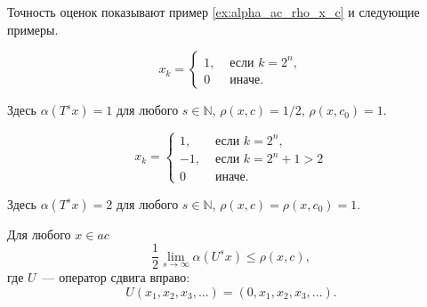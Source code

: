 Точность оценок показывают пример \ref{ex:alpha_ac_rho_x_c} и следующие примеры.
\begin{example}
	\begin{equation}
		x_k = \begin{cases}
			1, &\mbox{~если~} k = 2^n,
			\\
			0 &\mbox{~иначе.}
		\end{cases}
	\end{equation}
\end{example}
Здесь $\alpha(T^s x) = 1$ для любого $s\in\mathbb{N}$, $\rho(x,c) = 1/2$, $\rho(x, c_0) = 1$.

\begin{example}
	\begin{equation}
		x_k = \begin{cases}
			1, &\mbox{~если~} k = 2^n,
			\\
			-1, &\mbox{~если~} k = 2^n + 1 > 2
			\\
			0 &\mbox{~иначе.}
		\end{cases}
	\end{equation}
\end{example}
Здесь $\alpha(T^s x) = 2$ для любого $s\in\mathbb{N}$, $\rho(x,c) = \rho(x, c_0) = 1$.


\begin{hypothesis}
	Для любого $x\in ac$
	\begin{equation}
		\frac{1}{2} \lim_{s\to\infty} \alpha(U^s x) \leq \rho(x,c)
		,
	\end{equation}
	где $U$~--- оператор сдвига вправо:
	\begin{equation}
		U(x_1, x_2, x_3, ...) = (0, x_1, x_2, x_3, ...)
		.
	\end{equation}
\end{hypothesis}
